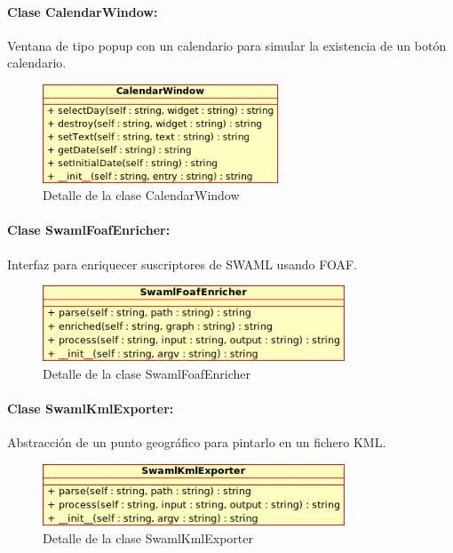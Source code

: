 \paragraph{Clase CalendarWindow:}

Ventana de tipo popup con un calendario para simular la existencia de un
botón calendario.

\begin{figure}[H]
	\centering
 	\includegraphics[width=7cm]{images/uml/clases/calendarwindow-class.png}
	\caption{Detalle de la clase CalendarWindow}
	\label{fig:uml:calenarwindow-class}
\end{figure}

\paragraph{Clase SwamlFoafEnricher:}

Interfaz para enriquecer suscriptores de SWAML usando FOAF.

\begin{figure}[H]
	\centering
 	\includegraphics[width=9cm]{images/uml/clases/swamlfoafenricher-class.png}
	\caption{Detalle de la clase SwamlFoafEnricher}
	\label{fig:uml:swamlfoafenricher-class}
\end{figure}

\paragraph{Clase SwamlKmlExporter:}

Abstracción de un punto geográfico para pintarlo en un fichero KML.

\begin{figure}[H]
	\centering
 	\includegraphics[width=9cm]{images/uml/clases/swamlkmlexporter-class.png}
	\caption{Detalle de la clase SwamlKmlExporter}
	\label{fig:uml:swamlkmlexporter-class}
\end{figure}
